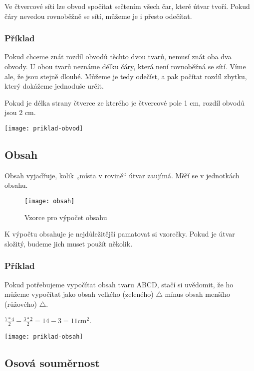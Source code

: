 Ve čtvercové síti lze obvod spočítat sečtením všech čar, které útvar tvoří. Pokud čáry nevedou rovnoběžně se sítí, můžeme je i přesto odečítat.

\subsubsection{Příklad}
\begin{minipage}[t]{\linewidth}
Pokud chceme znát rozdíl obvodů těchto dvou tvarů, nemusí znát oba dva obvody. U obou tvarů neznáme délku čáry, která není rovnoběžná se sítí. Víme ale, že jsou stejně dlouhé. Můžeme je tedy odečíst, a pak počítat rozdíl zbytku, který dokážeme jednoduše určit.

Pokud je délka strany čtverce ze kterého je čtvercové pole 1 cm, rozdíl obvodů jsou 2 cm.
\begin{center}
\texttt{[image: priklad-obvod]}
\end{center}
\end{minipage}

\subsection{Obsah}
Obsah vyjadřuje, kolik „místa v rovině“ útvar zaujímá. Měří se v jednotkách obsahu. \cite{umim_mat}
\begin{figure}[p]
	\caption{Vzorce pro výpočet obsahu \cite{umim_mat}}
	\centering
	\texttt{[image: obsah]}
\end{figure}


K výpočtu obsahuje je nejdůležitější pamatovat si vzorečky. Pokud je útvar složitý, budeme jich muset použít několik.

\subsubsection{Příklad}
\begin{minipage}[t]{\linewidth}
Pokud potřebujeme vypočítat obsah tvaru ABCD, stačí si uvědomit, že ho můžeme vypočítat jako obsah velkého (zeleného) $\triangle$ mínus obsah menšího (růžového) $\triangle$.

$ \frac{7*4}{2} - \frac{3*2}{2} =  14 - 3 = 11 \text{cm}^{2}$.
	\begin{center}
		\texttt{[image: priklad-obsah]}
	\end{center}
\end{minipage}

\subsection{Osová souměrnost}

